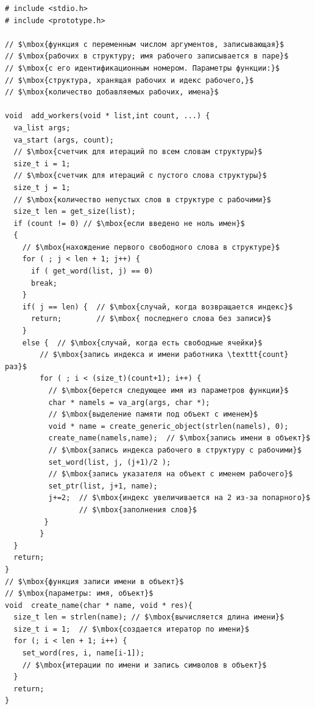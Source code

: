 \begin{lstlisting}[mathescape]
# include <stdio.h>
# include <prototype.h>

// $\mbox{функция с переменным числом аргументов, записывающая}$
// $\mbox{рабочих в структуру; имя рабочего записывается в паре}$
// $\mbox{с его идентификационным номером. Параметры функции:}$
// $\mbox{структура, хранящая рабочих и идекс рабочего,}$
// $\mbox{количество добавляемых рабочих, имена}$

void  add_workers(void * list,int count, ...) { 
  va_list args;                                 
  va_start (args, count);
  // $\mbox{счетчик для итераций по всем словам структуры}$
  size_t i = 1;
  // $\mbox{счетчик для итераций с пустого слова структуры}$
  size_t j = 1;
  // $\mbox{количество непустых слов в структуре с рабочими}$
  size_t len = get_size(list);
  if (count != 0) // $\mbox{если введено не ноль имен}$
  {
    // $\mbox{нахождение первого свободного слова в структуре}$
    for ( ; j < len + 1; j++) {  
      if ( get_word(list, j) == 0)  
      break;
    }
    if( j == len) {  // $\mbox{случай, когда возвращается индекс}$
      return;        // $\mbox{ последнего слова без записи}$
    }
    else {  // $\mbox{случай, когда есть свободные ячейки}$
        // $\mbox{запись индекса и имени работника \texttt{count} раз}$
        for ( ; i < (size_t)(count+1); i++) {
          // $\mbox{берется следующее имя из параметров функции}$
          char * namels = va_arg(args, char *);
          // $\mbox{выделение памяти под объект с именем}$
          void * name = create_generic_object(strlen(namels), 0);  
          create_name(namels,name);  // $\mbox{запись имени в объект}$
          // $\mbox{запись индекса рабочего в структуру с рабочими}$
          set_word(list, j, (j+1)/2 );
          // $\mbox{запись указателя на объект с именем рабочего}$
          set_ptr(list, j+1, name);  
          j+=2;  // $\mbox{индекс увеличивается на 2 из-за попарного}$
                 // $\mbox{заполнения слов}$
         }
        }
  }
  return;
}
// $\mbox{функция записи имени в объект}$
// $\mbox{параметры: имя, объект}$
void  create_name(char * name, void * res){
  size_t len = strlen(name); // $\mbox{вычисляется длина имени}$
  size_t i = 1;  // $\mbox{создается итератор по имени}$
  for (; i < len + 1; i++) {
    set_word(res, i, name[i-1]);  
    // $\mbox{итерации по имени и запись символов в объект}$
  }
  return;
}


\end{lstlisting}
